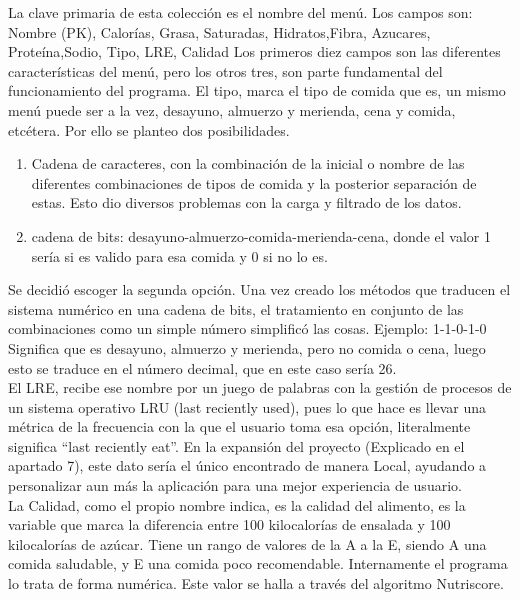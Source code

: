 La clave primaria de esta colección es el nombre del menú. Los campos son:
Nombre (PK), Calorías, Grasa, Saturadas, Hidratos,Fibra, Azucares, Proteína,Sodio, Tipo, LRE, Calidad
Los primeros diez campos son las diferentes características del menú, pero los otros tres, son parte fundamental del funcionamiento del programa.
El tipo, marca el tipo de comida que es, un mismo menú puede ser a la vez, desayuno, almuerzo y merienda, cena y comida, etcétera. Por ello se planteo dos posibilidades.
\begin{enumerate}
\item Cadena de caracteres, con la combinación de la inicial o nombre de las diferentes combinaciones de tipos de comida y la posterior separación de estas. Esto dio diversos problemas con la carga y filtrado de los datos.
\item cadena de bits: desayuno-almuerzo-comida-merienda-cena, donde el valor 1 sería si es valido para esa comida y 0 si no lo es.
\end{enumerate} 
Se decidió escoger la segunda opción. Una vez creado los métodos que traducen el sistema numérico en una cadena de bits, el tratamiento en conjunto de las combinaciones como un simple número simplificó las cosas. Ejemplo:
1-1-0-1-0 \\
Significa que es desayuno, almuerzo y merienda, pero no comida o cena, luego esto se traduce en el número decimal, que en este caso sería 26.\\

El LRE, recibe ese nombre por un juego de palabras con la gestión de procesos de un sistema operativo LRU (last reciently used), pues lo que hace es llevar una métrica de la frecuencia con la que el usuario toma esa opción, literalmente significa “last reciently eat”. En la expansión del proyecto (Explicado en el apartado 7), este dato sería el único encontrado de manera Local, ayudando a personalizar aun más la aplicación para una mejor experiencia de usuario. \\

La Calidad, como el propio nombre indica, es la calidad del alimento, es la variable que marca la diferencia entre 100 kilocalorías de ensalada y 100 kilocalorías de azúcar. Tiene un rango de valores de la A a la E, siendo A una comida saludable, y E una comida poco recomendable. Internamente el programa lo trata de forma numérica. Este valor se halla a través del algoritmo Nutriscore.

